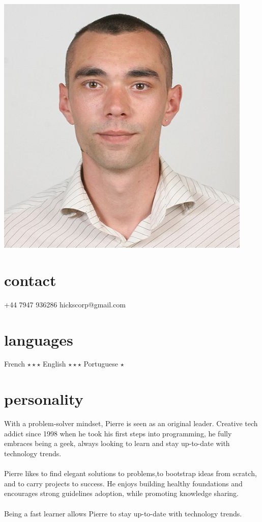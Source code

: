 \documentclass[]{cv-style}
\begin{document}

\begin{aside}
\includegraphics[scale=0.24]{photo.jpg}
\section{contact}
  +44 7947 936286
  hickscorp@gmail.com
\section{languages}
  French {\color{orange} $\star\star\star$}
  English {\color{orange} $\star\star\star$}
  Portuguese {\color{orange} $\star$}
\end{aside}

\section{personality}
  With a problem-solver mindset, Pierre is seen as an original leader. Creative tech addict since 1998 when he took his first steps into programming, he fully embraces being a geek, always looking to learn and stay up-to-date with technology trends.\\\\
  Pierre likes to find elegant solutions to problems,to bootstrap ideas from scratch, and to carry projects to success. He enjoys building healthy foundations and encourages strong guidelines adoption, while promoting knowledge sharing.\\\\
  Being a fast learner allows Pierre to stay up-to-date with technology trends.
\end{document}
